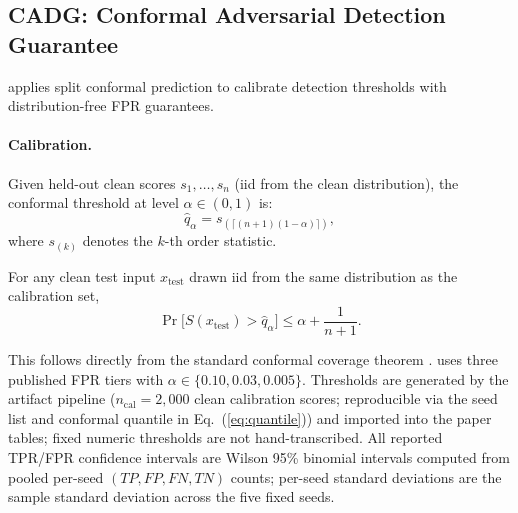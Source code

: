 \subsection{CADG: Conformal Adversarial Detection Guarantee}
\label{sec:cadg}

\prism applies split conformal prediction \cite{vovk2005algorithmic,angelopoulos2023gentle} 
to calibrate detection thresholds with distribution-free FPR guarantees.

\paragraph{Calibration.}
Given held-out clean scores $s_1, \ldots, s_n$ (iid from the clean distribution), 
the conformal threshold at level $\alpha \in (0,1)$ is:
\begin{equation}
  \hat{q}_\alpha = s_{(\lceil (n+1)(1-\alpha) \rceil)},
  \label{eq:quantile}
\end{equation}
where $s_{(k)}$ denotes the $k$-th order statistic.

\begin{proposition}
\label{prop:coverage}
For any clean test input $x_{\text{test}}$ drawn iid from the same 
distribution as the calibration set,
\[
  \Pr\bigl[S(x_{\text{test}}) > \hat{q}_\alpha\bigr] \leq \alpha + \frac{1}{n+1}.
\]
\end{proposition}

\noindent
This follows directly from the standard conformal coverage theorem 
\cite{vovk2005algorithmic}.
\prism uses three published FPR tiers with $\alpha \in \{0.10, 0.03, 0.005\}$.
Thresholds are generated by the artifact pipeline ($n_\text{cal}=2{,}000$
clean calibration scores; reproducible via the seed list and conformal
quantile in Eq.~(\ref{eq:quantile})) and imported into the paper tables;
fixed numeric thresholds are not hand-transcribed. All reported TPR/FPR
confidence intervals are Wilson 95\% binomial intervals computed from
pooled per-seed $(TP,FP,FN,TN)$ counts; per-seed standard deviations are
the sample standard deviation across the five fixed seeds.
